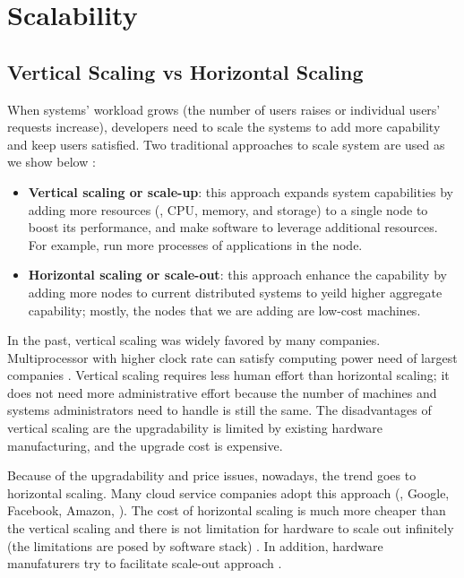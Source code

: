 \section{Scalability}
\label{bg-sc}

\subsection{Vertical Scaling vs Horizontal Scaling} 
\label{bg-sc-type}

When systems' workload grows (the number of users raises or individual users'
requests increase), developers need to scale the systems to add more capability
and keep users satisfied. Two traditional approaches to scale system are used as
we show below \cite{Michael+07-ScaleUpXScaleOut}:
\begin{itemize}

\item \textbf{Vertical scaling or scale-up}: this approach expands system
capabilities by adding more resources (\eg, CPU, memory, and storage) to a
single node to boost its performance, and make software to leverage additional
resources. For example, run more processes of applications in the node.

\item \textbf{Horizontal scaling or scale-out}: this approach enhance the
capability by adding more nodes to current distributed systems to yeild higher
aggregate capability; mostly, the nodes that we are adding are low-cost
machines.

\end{itemize}

In the past, vertical scaling was widely favored by many companies.
Multiprocessor with higher clock rate can satisfy computing power need of
largest companies \cite{Michael+07-ScaleUpXScaleOut}. Vertical scaling requires
less human effort than horizontal scaling; it does not need more administrative
effort because the number of machines and systems administrators need to handle
is still the same. The disadvantages of vertical scaling are the upgradability
is limited by existing hardware manufacturing, and the upgrade cost is
expensive.

Because of the upgradability and price issues, nowadays, the trend goes to
horizontal scaling. Many cloud service companies adopt this approach (\eg,
Google, Facebook, Amazon, \etc). The cost of horizontal scaling is much more
cheaper than the vertical scaling and there is not limitation for hardware to
scale out infinitely (the limitations are posed by software stack)
\cite{ScaleUpVsScaleOut}. In addition, hardware manufaturers try to facilitate
scale-out approach \cite{Michael+07-ScaleUpXScaleOut}.

